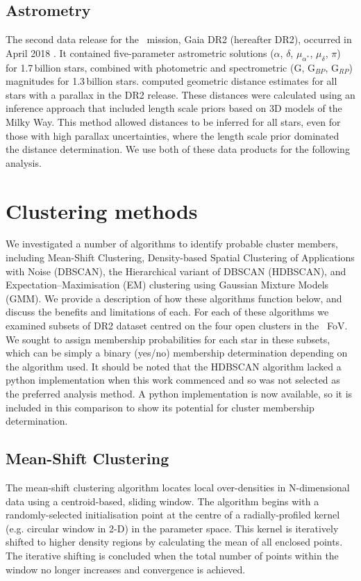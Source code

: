 \subsection{Astrometry}
The second data release for the \Gaia~mission, Gaia DR2 (hereafter DR2), occurred in April 2018 \citep{gaia_collaboration_gaia_2018}. It contained five-parameter astrometric solutions ($\alpha$, $\delta$, $\mu_{\alpha^*}$, $\mu_{\delta}$, $\pi$) for 1.7\,billion stars, combined with photometric and spectrometric (G, G$_{BP}$, G$_{RP}$) magnitudes for 1.3\,billion stars. \citet{bailer-jones_estimating_2018} computed geometric distance estimates for all stars with a parallax in the DR2 release. These distances were calculated using an inference approach that included length scale priors based on 3D models of the Milky Way. This method allowed distances to be inferred for all stars, even for those with high parallax uncertainties, where the length scale prior dominated the distance determination. We use both of these data products for the following analysis.

\section{Clustering methods}
We investigated a number of algorithms to identify probable cluster members, including Mean-Shift Clustering, Density-based Spatial Clustering of Applications with Noise (DBSCAN), the Hierarchical variant of DBSCAN (HDBSCAN), and Expectation–Maximisation (EM) clustering using Gaussian Mixture Models (GMM). We provide a description of how these algorithms function below, and discuss the benefits and limitations of each. For each of these algorithms we examined subsets of DR2 dataset centred on the four open clusters in the \Kepler~FoV. We sought to assign membership probabilities for each star in these subsets, which can be simply a binary (yes/no) membership determination depending on the algorithm used. It should be noted that the HDBSCAN algorithm lacked a python implementation when this work commenced and so was not selected as the preferred analysis method. A python implementation is now available, so it is included in this comparison to show its potential for cluster membership determination.

\subsection{Mean-Shift Clustering}

The mean-shift clustering algorithm \citep{comaniciu_mean_2002} locates local over-densities in N-dimensional data using a centroid-based, sliding window. The algorithm begins with a randomly-selected initialisation point at the centre of a radially-profiled kernel (e.g. circular window in 2-D) in the parameter space. This kernel is iteratively shifted to higher density regions by calculating the mean of all enclosed points. The iterative shifting is concluded when the total number of points within the window no longer increases and convergence is achieved. 

